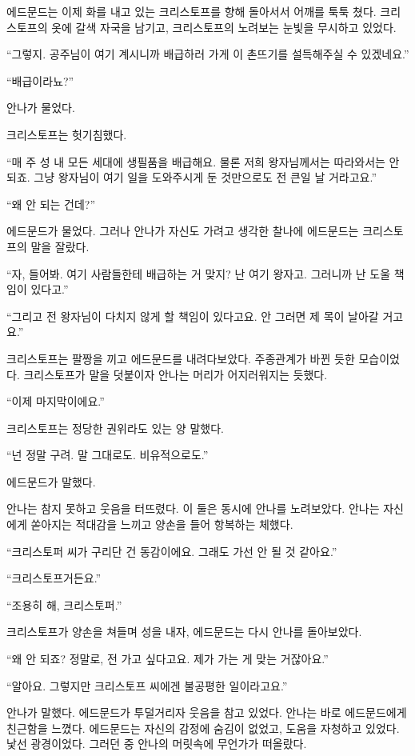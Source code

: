 에드문드는 이제 화를 내고 있는 크리스토프를 향해 돌아서서 어깨를 툭툭 쳤다. 크리스토프의 옷에 갈색 자국을 남기고, 크리스토프의 노려보는 눈빛을 무시하고 있었다.

``그렇지. 공주님이 여기 계시니까 배급하러 가게 이 촌뜨기를 설득해주실 수 있겠네요.''

``배급이라뇨?''

안나가 물었다.

크리스토프는 헛기침했다.

``매 주 성 내 모든 세대에 생필품을 배급해요. 물론 저희 왕자님께서는 따라와서는 안 되죠. 그냥 왕자님이 여기 일을 도와주시게 둔 것만으로도 전 큰일 날 거라고요.''

``왜 안 되는 건데?''

에드문드가 물었다. 그러나 안나가 자신도 가려고 생각한 찰나에 에드문드는 크리스토프의 말을 잘랐다.

``자, 들어봐. 여기 사람들한테 배급하는 거 맞지? 난 여기 왕자고. 그러니까 난 도울 책임이 있다고.''

``그리고 전 왕자님이 다치지 않게 할 책임이 있다고요. 안 그러면 제 목이 날아갈 거고요.''

크리스토프는 팔짱을 끼고 에드문드를 내려다보았다. 주종관계가 바뀐 듯한 모습이었다. 크리스토프가 말을 덧붙이자 안나는 머리가 어지러워지는 듯했다.

``이제 마지막이에요.''

크리스토프는 정당한 권위라도 있는 양 말했다.

``넌 정말 구려. 말 그대로도. 비유적으로도.''

에드문드가 말했다.

안나는 참지 못하고 웃음을 터뜨렸다. 이 둘은 동시에 안나를 노려보았다. 안나는 자신에게 쏟아지는 적대감을 느끼고 양손을 들어 항복하는 체했다.

``크리스토퍼 씨가 구리단 건 동감이에요. 그래도 가선 안 될 것 같아요.''

``크리스토프거든요.''

``조용히 해, 크리스토퍼.''

크리스토프가 양손을 쳐들며 성을 내자, 에드문드는 다시 안나를 돌아보았다.

``왜 안 되죠? 정말로, 전 가고 싶다고요. 제가 가는 게 맞는 거잖아요.''

``알아요. 그렇지만 크리스토프 씨에겐 불공평한 일이라고요.''

안나가 말했다. 에드문드가 투덜거리자 웃음을 참고 있었다. 안나는 바로 에드문드에게 친근함을 느꼈다. 에드문드는 자신의 감정에 숨김이 없었고, 도움을 자청하고 있었다. 낯선 광경이었다. 그러던 중 안나의 머릿속에 무언가가 떠올랐다.


